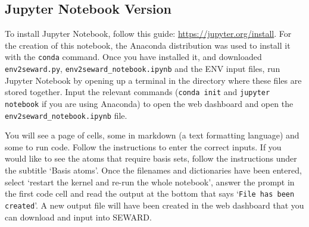 \documentclass[10pt]{article}
\begin{document}
\subsection{Jupyter Notebook Version}
To install Jupyter Notebook, follow this guide: \url{https://jupyter.org/install}. For the creation of this notebook, the Anaconda distribution was used to install it with the \texttt{conda} command. Once you have installed it, and downloaded \texttt{env2seward.py}, \texttt{env2seward\_notebook.ipynb} and the ENV input files, run Jupyter Notebook by opening up a terminal in the directory where these files are stored together. Input the relevant commands (\texttt{conda init} and \texttt{jupyter notebook} if you are using Anaconda) to open the web dashboard and open the \texttt{env2seward\_notebook.ipynb} file.

You will see a page of cells, some in markdown (a text formatting language) and some to run code. Follow the instructions to enter the correct inputs. If you would like to see the atoms that require basis sets, follow the instructions under the subtitle `Basis atoms'. Once the filenames and dictionaries have been entered, select `restart the kernel and re-run the whole notebook', answer the prompt in the first code cell and read the output at the bottom that says `\texttt{File has been created}'. A new output file will have been created in the web dashboard that you can download and input into SEWARD.
\end{document}

